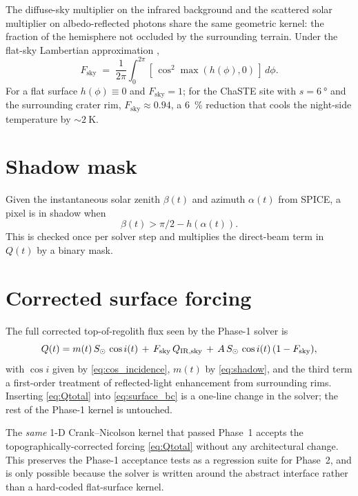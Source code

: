 The diffuse-sky multiplier on the infrared background and the scattered
solar multiplier on albedo-reflected photons share the same geometric
kernel: the fraction of the hemisphere not occluded by the surrounding
terrain.  Under the flat-sky Lambertian approximation
\citep{dozier1990},
\begin{equation}
  F_{\mathrm{sky}}
  \;=\;
  \frac{1}{2\pi}\int_{0}^{2\pi}
  \left[\,\cos^{2}\!\max(h(\phi),0)\,\right]\,d\phi.
  \label{eq:Fsky}
\end{equation}
For a flat surface $h(\phi)\equiv 0$ and $F_{\mathrm{sky}}=1$; for the
ChaSTE site with $s=\SI{6}{\degree}$ and the surrounding crater rim,
$F_{\mathrm{sky}}\approx 0.94$, a \SI{6}{\percent} reduction that
cools the night-side temperature by $\sim\SI{2}{\kelvin}$.

\section{Shadow mask}

Given the instantaneous solar zenith $\beta(t)$ and azimuth
$\alpha(t)$ from SPICE, a pixel is in shadow when
\begin{equation}
  \beta(t) > \pi/2 - h(\alpha(t)).
  \label{eq:shadow}
\end{equation}
This is checked once per solver step and multiplies the direct-beam
term in $Q(t)$ by a binary mask.

\section{Corrected surface forcing}

The full corrected top-of-regolith flux seen by the Phase-1 solver is
\begin{equation}
  Q(t) =
  m(t)\,S_{\odot} \,\cos i(t)
  \,+\, F_{\mathrm{sky}}\,Q_{\mathrm{IR,sky}}
  \,+\, A\,S_{\odot}\,\cos i(t)\,(1-F_{\mathrm{sky}}),
  \label{eq:Qtotal}
\end{equation}
with $\cos i$ given by \cref{eq:cos_incidence}, $m(t)$ by
\cref{eq:shadow}, and the third term a first-order treatment of
reflected-light enhancement from surrounding rims.  Inserting
\cref{eq:Qtotal} into \cref{eq:surface_bc} is a one-line change in the
solver; the rest of the Phase-1 kernel is untouched.

\begin{novelty}
The \emph{same} 1-D Crank--Nicolson kernel that passed Phase~1 accepts
the topographically-corrected forcing \cref{eq:Qtotal} without any
architectural change.  This preserves the Phase-1 acceptance tests as
a regression suite for Phase~2, and is only possible because the
solver is written around the abstract 
interface rather than a hard-coded flat-surface kernel.
\end{novelty}

